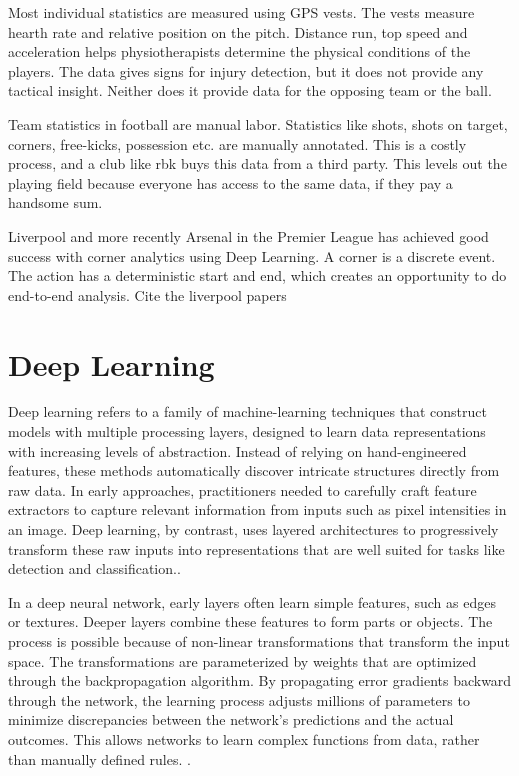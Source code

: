 Most individual statistics are measured using GPS vests. The vests measure hearth rate and relative position on the pitch. Distance run, top speed and acceleration helps physiotherapists determine the physical conditions of the players. The data gives signs for injury detection, but it does not provide any tactical insight. Neither does it provide data for the opposing team or the ball. 

Team statistics in football are manual labor. Statistics like shots, shots on target, corners, free-kicks, possession etc. are manually annotated. This is a costly process, and a club like \acrshort{rbk} buys this data from a third party. This levels out the playing field because everyone has access to the same data, if they pay a handsome sum. 

Liverpool and more recently Arsenal in the Premier League has achieved good success with corner analytics using Deep Learning. A corner is a discrete event. The action has a deterministic start and end, which creates an opportunity to do end-to-end analysis. Cite the liverpool papers

\section{Deep Learning}
\label{sec:deep_learning}
Deep learning refers to a family of machine-learning techniques that construct models with multiple processing layers, designed to learn data representations with increasing levels of abstraction. Instead of relying on hand-engineered features, these methods automatically discover intricate structures directly from raw data. In early approaches, practitioners needed to carefully craft feature extractors to capture relevant information from inputs such as pixel intensities in an image. Deep learning, by contrast, uses layered architectures to progressively transform these raw inputs into representations that are well suited for tasks like detection and classification.\cite{lecun_deep_learning_2015}. 

In a deep neural network, early layers often learn simple features, such as edges or textures. Deeper layers combine these features to form parts or objects. The process is possible because of non-linear transformations that transform the input space. The transformations are parameterized by weights that are optimized through the backpropagation algorithm. By propagating error gradients backward through the network, the learning process adjusts millions of parameters to minimize discrepancies between the network’s predictions and the actual outcomes. This allows networks to learn complex functions from data, rather than manually defined rules. \cite{sanderson_deep_learning_2024}. 


